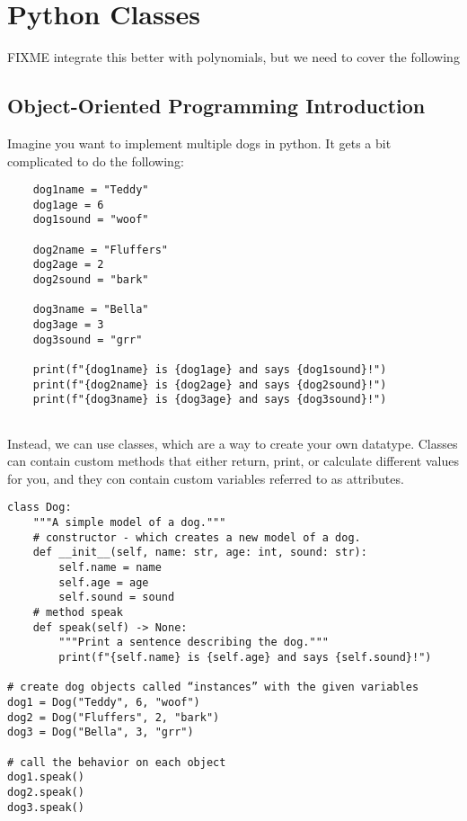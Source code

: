 \chapter{Python Classes}
FIXME integrate this better with polynomials, but we need to cover the following
\section{Object-Oriented Programming Introduction}
Imagine you want to implement multiple dogs in python. It gets a bit complicated to do the following:

\begin{verbatim}
    dog1name = "Teddy"
    dog1age = 6
    dog1sound = "woof"

    dog2name = "Fluffers"
    dog2age = 2
    dog2sound = "bark"

    dog3name = "Bella"
    dog3age = 3
    dog3sound = "grr"

    print(f"{dog1name} is {dog1age} and says {dog1sound}!")
    print(f"{dog2name} is {dog2age} and says {dog2sound}!")
    print(f"{dog3name} is {dog3age} and says {dog3sound}!")
    

\end{verbatim}

Instead, we can use classes, which are a way to create your own datatype.
Classes can contain custom methods that either return, print, or calculate different values for you, 
and they con contain custom variables referred to as attributes.

\begin{verbatim}
class Dog:
    """A simple model of a dog."""
    # constructor - which creates a new model of a dog. 
    def __init__(self, name: str, age: int, sound: str):
        self.name = name
        self.age = age
        self.sound = sound
    # method speak 
    def speak(self) -> None:
        """Print a sentence describing the dog."""
        print(f"{self.name} is {self.age} and says {self.sound}!")

# create dog objects called “instances” with the given variables
dog1 = Dog("Teddy", 6, "woof")
dog2 = Dog("Fluffers", 2, "bark")
dog3 = Dog("Bella", 3, "grr")

# call the behavior on each object
dog1.speak()
dog2.speak()
dog3.speak()

\end{verbatim}


